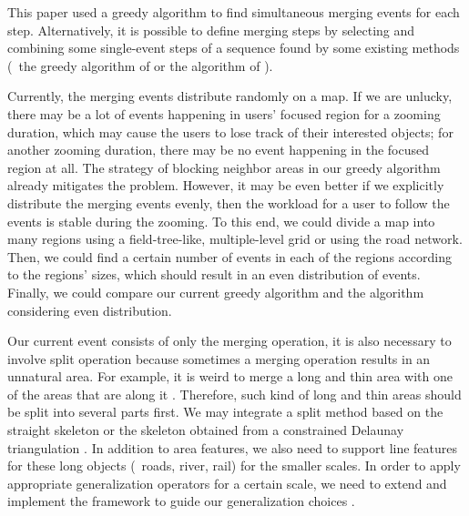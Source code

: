 \documentclass[twocolumn]{svjour3}          %
\begin{document}
This paper used a greedy algorithm 
to find simultaneous merging events for each step.
Alternatively, it is possible to define merging steps 
by selecting and combining some single-event steps of a sequence found 
by some existing methods
(\eg~the greedy algorithm of \citet{vanOosterom2005}
or the \Astar algorithm of \citet{Peng2020AreaAgg}).

Currently, the merging events distribute randomly on a map.
If we are unlucky, there may be a lot of events 
happening in users' focused region for a zooming duration,
which may cause the users to lose track of their interested objects;
for another zooming duration, 
there may be no event happening in the focused region at all.
The strategy of blocking neighbor areas in our greedy algorithm 
already mitigates the problem.
However, it may be even better if 
we explicitly distribute the merging events evenly, 
then the workload for a user to follow the events is stable during the zooming.
To this end, we could divide a map into many regions 
using a field-tree-like, multiple-level grid \citep{vanPutten1998NewGAP}
or using the road network.
Then, we could find a certain number of events in each of the regions 
according to the regions' sizes,
which should result in an even distribution of events.
Finally, we could compare our current greedy algorithm and 
the algorithm considering even distribution.


Our current event consists of only the merging operation,
it is also necessary to involve split operation
because sometimes a merging operation results in an unnatural area.
For example, it is weird to merge a long and thin area 
with one of the areas that are along it
\citep[see][]{Haunert2008Skeleton}.
Therefore, such kind of long and thin areas should be
split into several parts first.
We may integrate a split method based on the straight skeleton
\citep{Haunert2008Skeleton}
or the skeleton obtained from a constrained Delaunay triangulation
\citep{Ai2002GAP,Meijers2016Split}.
In addition to area features, we also need to support line features 
for these long objects (\eg~roads, river, rail) for the smaller scales.
In order to apply appropriate generalization operators
for a certain scale,
we need to extend and implement the framework 
to guide our generalization choices
\citep{Meijers2018Framework}.
\end{document}
